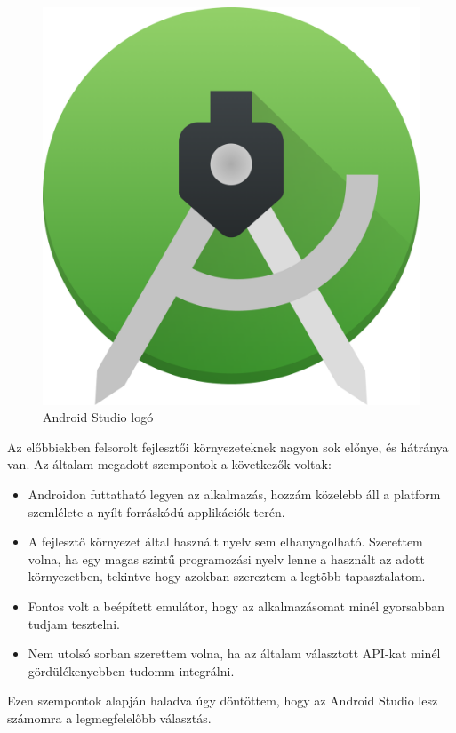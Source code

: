 \begin{figure}[h]
\centering
\includegraphics[scale=0.08]{images/androidstudio.png}
\caption{Android Studio logó}
\label{fig:androidstudio}
\end{figure}

Az előbbiekben felsorolt fejlesztői környezeteknek nagyon sok előnye, és hátránya van. 
Az általam megadott szempontok a következők voltak: 
\begin{itemize}
    \item Androidon futtatható legyen az alkalmazás, hozzám közelebb áll a platform szemlélete a nyílt forráskódú applikációk terén.
    \item A fejlesztő környezet által használt nyelv sem elhanyagolható. Szerettem volna, ha egy magas szintű programozási nyelv lenne a használt az adott környezetben, tekintve hogy azokban szereztem a legtöbb tapasztalatom.
    \item Fontos volt a beépített emulátor, hogy az alkalmazásomat minél gyorsabban tudjam tesztelni.
    \item Nem utolsó sorban szerettem volna, ha az általam választott API-kat minél gördülékenyebben tudomm integrálni.
\end{itemize}

Ezen szempontok alapján haladva úgy döntöttem, hogy az Android Studio lesz számomra a legmegfelelőbb választás.

